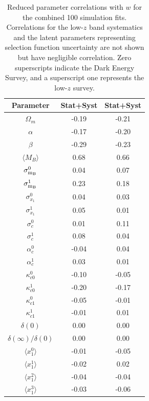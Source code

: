 \documentclass[a4paper,fleqn,usenatbib]{mnras}
\newcommand{\gten}{\citetalias{Guy2010}}
\newcommand{\celeven}{\citetalias{Chotard2011}}
\begin{document}
\begin{table}
	\centering
	\caption{Reduced parameter correlations with $w$ for the combined 100 simulation fits. Correlations for the low-$z$ band systematics and the latent parameters representing selection function uncertainty are not shown but have negligible correlation. Zero superscripts indicate the Dark Energy Survey, and a superscript one represents the low-$z$ survey.}
	\label{tab:parameter_correlations}
	\begin{tabular}{c|cc}
		Parameter & {\gten} Stat+Syst & {\celeven} Stat+Syst  \\
		\hline
		$\Omega_m$ &   -0.19 &     -0.21     \\
		$\alpha$ &   -0.17 &     -0.20     \\
		$\beta$ &   -0.29 &     -0.23     \\
		$\langle M_B \rangle$ &    0.68 &      0.66     \\
		$\sigma_{\rm m_B}^{0}$ &    0.04 &      0.07     \\
		$\sigma_{\rm m_B}^{1}$ &    0.23 &      0.18     \\
		$\sigma_{x_1}^{0}$ &    0.04 &      0.03     \\
		$\sigma_{x_1}^{1}$ &    0.05 &      0.01     \\
		$\sigma_{c}^{0}$ &    0.01 &      0.11     \\
		$\sigma_{c}^{1}$ &    0.08 &      0.04     \\
		$\alpha_c^{0}$ &   -0.04 &      0.04     \\
		$\alpha_c^{1}$ &    0.03 &      0.01     \\
		$\kappa_{c0}^{0}$ &   -0.10 &     -0.05     \\
		$\kappa_{c0}^{1}$ &   -0.20 &     -0.17     \\
		$\kappa_{c1}^{0}$ &   -0.05 &     -0.01     \\
		$\kappa_{c1}^{1}$ &   -0.01 &      0.01     \\
		$\delta(0)$ &    0.00 &      0.00     \\
		$\delta(\infty)/\delta(0)$ &    0.00 &      0.00     \\
		$\langle x_1^{0} \rangle$ &   -0.01 &     -0.05     \\
		$\langle x_1^{1} \rangle$ &   -0.02 &      0.02     \\
		$\langle x_1^{2} \rangle$ &   -0.04 &     -0.04     \\
		$\langle x_1^{3} \rangle$ &   -0.03 &     -0.06     \\

\end{tabular}
\end{table}
\end{document}
